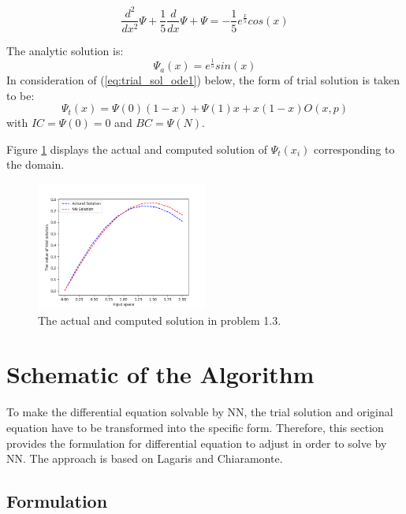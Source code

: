 \documentclass{article}
\begin{document}
\[\frac{d^2}{dx^2} \Psi + \frac{1}{5} \frac{d}{dx} \Psi + \Psi= -\frac{1}{5}e^{\frac{x}{5}}cos(x)\]

\medskip \noindent
The analytic solution is:
\[\Psi_{a}(x) = e^{\frac{1}{5}}sin(x) \]
In consideration of (\ref{eq:trial_sol_ode1}) below, the form of trial solution is taken to be: 
\[\Psi_t(x) = \Psi(0)(1-x)+ \Psi(1)x+x(1-x)O(x,p)\] with $IC = \Psi(0)=0$ and $BC =\Psi(N)$.

\medspace \noindent
Figure \ref{fig:trial_ode3} displays the actual and computed solution of $\Psi _t(x_i)$ corresponding to the domain. 

\begin{figure}
	\centering
	\includegraphics[width=0.5\textwidth]{ode_3.png}
	\caption{The actual and computed solution in problem 1.3. }
	\label{fig:trial_ode3}
\end{figure}

\section{Schematic of the Algorithm}

To make the differential equation solvable by NN, the trial solution and original equation have to be transformed into the specific form.  
Therefore, this section provides the formulation for differential equation to adjust in order to solve by NN.  
The approach is based on Lagaris\cite{lagaris} and  Chiaramonte\cite{chiaramonte}.

\subsection{Formulation}
 
\end{document}

